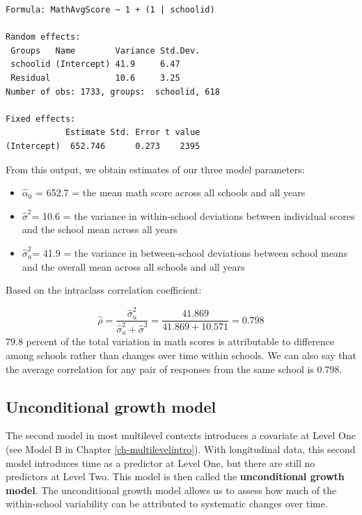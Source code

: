 \documentclass[
]{krantz}
\begin{document}
\begin{verbatim}
Formula: MathAvgScore ~ 1 + (1 | schoolid)

Random effects:
 Groups   Name        Variance Std.Dev.
 schoolid (Intercept) 41.9     6.47    
 Residual             10.6     3.25    
Number of obs: 1733, groups:  schoolid, 618

Fixed effects:
            Estimate Std. Error t value
(Intercept)  652.746      0.273    2395
\end{verbatim}

From this output, we obtain estimates of our three model parameters:

\begin{itemize}
\item
  \(\hat{\alpha}_{0}\) = 652.7 = the mean math score across all schools and all years
\item
  \(\hat{\sigma}^2\)= 10.6 = the variance in within-school deviations between individual scores and the school mean across all years
\item
  \(\hat{\sigma}^2_u\)= 41.9 = the variance in between-school deviations between school means and the overall mean across all schools and all years
\end{itemize}

Based on the intraclass correlation coefficient:

\begin{equation}
\hat{\rho}=\frac{\hat{\sigma}^2_u}{\hat{\sigma}^2_u + \hat{\sigma}^2} = \frac{41.869}{41.869+10.571}= 0.798
\end{equation}
79.8 percent of the total variation in math scores is attributable to difference among schools rather than changes over time within schools. We can also say that the average correlation for any pair of responses from the same school is 0.798.

\hypertarget{modelb}{%
\subsection{Unconditional growth model}\label{modelb}}

The second model in most multilevel contexts introduces a covariate at Level One (see Model B in Chapter \ref{ch-multilevelintro}). With longitudinal data, this second model introduces time as a predictor at Level One, but there are still no predictors at Level Two. This model is then called the \textbf{unconditional growth model}. The unconditional growth model allows us to assess how much of the within-school variability can be attributed to systematic changes over time.
\end{document}
